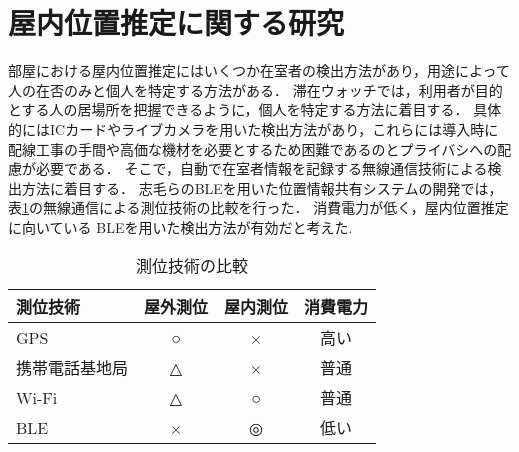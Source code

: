 


\section{屋内位置推定に関する研究}\label{2.1}
部屋における屋内位置推定にはいくつか在室者の検出方法があり，用途によって人の在否のみと個人を特定する方法がある．
滞在ウォッチでは，利用者が目的とする人の居場所を把握できるように，個人を特定する方法に着目する．
具体的にはICカードやライブカメラを用いた検出方法があり，これらには導入時に配線工事の手間や高価な機材を必要とするため困難であるのとプライバシへの配慮が必要である．
そこで，自動で在室者情報を記録する無線通信技術による検出方法に着目する．
志毛らのBLEを用いた位置情報共有システムの開発\cite{communication}では，
表\ref{tb:positioning}の無線通信による測位技術の比較を行った．
消費電力が低く，屋内位置推定に向いている BLEを用いた検出方法が有効だと考えた.


\begin{table}[htb]
  \begin{center}
    \caption{測位技術の比較}
    \label{tb:positioning}
    \begin{tabular}{|l|c|c|c|} \hline
      測位技術       & 屋外測位 & 屋内測位 & 消費電力 \\ \hline \hline
      GPS            & ○        & ×        & 高い     \\
      携帯電話基地局 & △        & ×        & 普通     \\
      Wi-Fi          & △        & ○        & 普通     \\
      BLE            & ×        & ◎        & 低い     \\\hline
    \end{tabular}
  \end{center}
\end{table}




